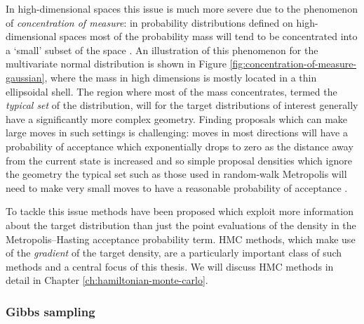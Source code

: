 In high-dimensional spaces this issue is much more severe due to the phenomenon of \emph{concentration of measure}: in probability distributions defined on high-dimensional spaces most of the probability mass will tend to be concentrated into a `small' subset of the space \citep{mackay2003information,barp2017geometry}. An illustration of this phenomenon for the multivariate normal distribution is shown in Figure \ref{fig:concentration-of-measure-gaussian}, where the mass in high dimensions is mostly located in a thin ellipsoidal shell. The region where most of the mass concentrates, termed the \emph{typical set} of the distribution, will for the target distributions of interest generally have a significantly more complex geometry. Finding proposals which can make large moves in such settings is challenging: moves in most directions will have a probability of acceptance which exponentially drops to zero as the distance away from the current state is increased and so simple proposal densities which ignore the geometry the typical set such as those used in random-walk Metropolis will need to make very small moves to have a reasonable probability of acceptance \cite{betancourt2017conceptual}.

To tackle this issue methods have been proposed which exploit more information about the target distribution than just the point evaluations of the density in the Metropolis--Hasting acceptance probability term. \ac{HMC} methods, which make use of the \emph{gradient} of the target density, are a particularly important class of such methods and a central focus of this thesis. We will discuss \ac{HMC} methods in detail in Chapter \ref{ch:hamiltonian-monte-carlo}.


\subsubsection{Gibbs sampling}

